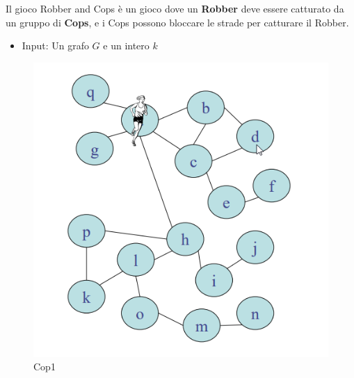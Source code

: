 \begin{definition}
    Il gioco Robber and Cops è un gioco dove un \textbf{Robber} deve essere catturato da un gruppo di \textbf{Cops}, e
    i Cops possono bloccare le strade per catturare il Robber.

    \begin{itemize}
        \item Input: Un grafo $G$ e un intero $k$
    \end{itemize}
\end{definition}

\begin{figure}[H]
    \centering
    \begin{minipage}[b]{0.45\linewidth}
        \includegraphics[width=\linewidth]{chapters/images/cop1.png}
        \caption{Cop1}
        \label{fig:5}
    \end{minipage}
    \hspace{0.5cm}
    \begin{minipage}[b]{0.45\linewidth}

\end{minipage}
\end{figure}
